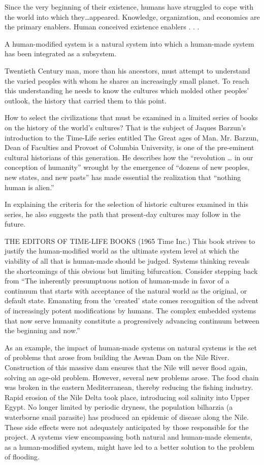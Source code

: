 Since the very beginning of their existence, humans have struggled to cope with the world into which they…appeared. Knowledge, organization, and economics are the primary enablers. Human conceived existence enablers . . . 

A human-modified system is a natural system into which a human-made system has been integrated as a subsystem.

Twentieth Century man, more than his ancestors, must attempt to understand the varied peoples with whom he shares an increasingly small planet. To reach this understanding he needs to know the cultures which molded other peoples’ outlook, the history that carried them to this point.

How to select the civilizations that must be examined in a limited series of books on the history of the world’s cultures?  That is the subject of Jaques Barzun’s introduction to the Time-Life series entitled The Great ages of Man. Mr. Barzun, Dean of Faculties and Provost of Columbia University, is one of the pre-eminent cultural historians of this generation. He describes how the “revolution … in our conception of humanity” wrought by the emergence of “dozens of new peoples, new states, and new pasts” has made essential the realization that “nothing human is alien.”

In explaining the criteria for the selection of historic cultures examined in this series, he also suggests the path that present-day cultures may follow in the future.

THE EDITORS OF TIME-LIFE BOOKS (1965 Time Inc.) This book strives to justify the human-modified world as the ultimate system level at which the viability of all that is human-made should be judged. Systems thinking reveals the shortcomings of this obvious but limiting bifurcation. Consider stepping back from “The inherently presumptuous notion of human-made in favor of a continuum that starts with acceptance of the natural world as the original, or default state. Emanating from the ‘created’ state comes recognition of the advent of increasingly potent modifications by humans. The complex embedded systems that now serve humanity constitute a progressively advancing continuum between the beginning and now.”

As an example, the impact of human-made systems on natural systems is the set of problems that arose from building the Aswan Dam on the Nile River. Construction of this massive dam ensures that the Nile will never flood again, solving an age-old problem. However, several new problems arose. The food chain was broken in the eastern Mediterranean, thereby reducing the fishing industry. Rapid erosion of the Nile Delta took place, introducing soil salinity into Upper Egypt. No longer limited by periodic dryness, the population bilharzia (a waterborne snail parasite) has produced an epidemic of disease along the Nile. These side effects were not adequately anticipated by those responsible for the project. A systems view encompassing both natural and human-made elements, as a human-modified system, might have led to a better solution to the problem of flooding.

